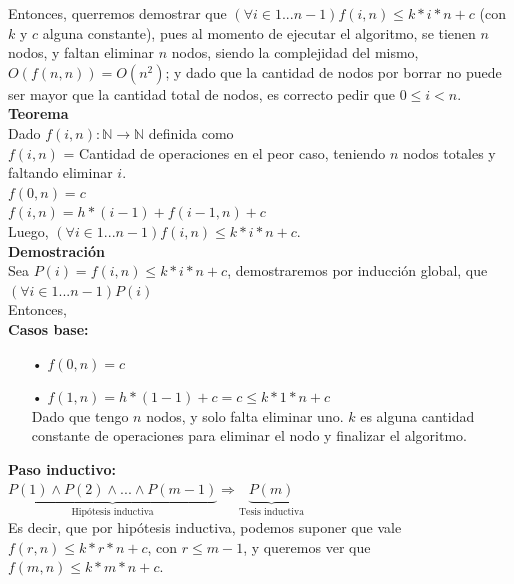 Entonces, querremos demostrar que $(\forall i \in {1...n-1}) f(i,n) \leq k*i*n + c$ (con $k$ y $c$ alguna constante), pues al momento de ejecutar el algoritmo, se tienen $n$ nodos, y faltan eliminar $n$ nodos, siendo la complejidad del mismo, $O(f(n,n)) = O(n^{2})$; y dado que la cantidad de nodos por borrar no puede ser mayor que la cantidad total de nodos, es correcto pedir que $0 \leq i < n$.\\

\newpage
{\large\textbf{Teorema}}\\

Dado $f(i,n): \mathbb{N} \rightarrow \mathbb{N}$ definida como\\

$f(i,n)$ = Cantidad de operaciones  en el peor caso, teniendo $n$ nodos totales y faltando eliminar $i$.\\

$f(0,n) = c$\\

$f(i,n) = h*(i-1) + f(i-1,n) + c$\\

Luego, $(\forall i \in {1...n-1}) f(i,n) \leq k*i*n + c$.\\

{\large\textbf{Demostración}}\\

Sea $P(i) = f(i,n) \leq k*i*n + c$, demostraremos por inducción global, que $(\forall i \in {1...n-1}) P(i)$\\

Entonces,\\

\textbf{Casos base:}

\begin{itemize}
    \item[•] $f(0,n) = c$
    \item[•] $f(1,n) = h*(1-1) + c = c \leq k*1*n + c$\\
    Dado que tengo $n$ nodos, y solo falta eliminar uno. $k$ es alguna cantidad constante de operaciones para eliminar el nodo y finalizar el algoritmo.
\end{itemize}

\textbf{Paso inductivo:}\\

$\underbrace{P(1) \wedge P(2) \wedge ... \wedge P(m-1)}_{\text{Hipótesis inductiva}} \Rightarrow \underbrace{P(m)}_{\text{Tesis inductiva}}$\\

Es decir, que por hipótesis inductiva, podemos suponer que vale $f(r,n) \leq k*r*n + c$, con $r \leq m-1$, y queremos ver que $f(m,n) \leq k*m*n + c$.\\

